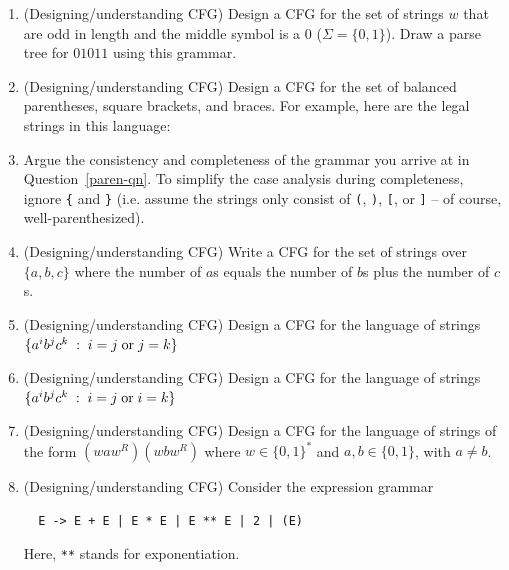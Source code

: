 \documentclass[12pt]{article}
\begin{document}
\begin{large}
\begin{enumerate}
\item (Designing/understanding CFG) Design a CFG for the  set of
  strings $w$ that are odd in length and the middle symbol is a $0$ ($\Sigma=\{0,1\}$).
  Draw a parse tree for $01011$ using this grammar.

\item \label{paren-qn} (Designing/understanding CFG) Design a CFG for the  set of
  balanced parentheses, square brackets, and braces. For example,
  here are the legal strings in this language:
  \begin{compactenum}
  \item   \verb| ()[]{} |
  \item   \verb|  {{[()()][{}]}} |
  \item   \verb| [ {{[()()][{}]}} ] |
  \item   \verb| [ {{[()()][{}]}} {[()()][{}]} ] ()[]{} |    
  \end{compactenum}

\item Argue the consistency and completeness of the grammar you arrive at in Question~\ref{paren-qn}.
  To simplify the case analysis during completeness,
  ignore \verb|{| and \verb|}| (i.e. assume the strings only consist of
  \verb|(|, \verb|)|, \verb|[|, or \verb|]| -- of course, well-parenthesized).

\item (Designing/understanding CFG)
  Write a CFG for the set of strings over $\{a,b,c\}$ where the number of $a$s
  equals the number of $b$s plus the number of $c$s.


\item \label{iEQjORjEQk}
  (Designing/understanding CFG) Design a CFG for the language of strings
  \( \{a^i b^j c^k \;:\; i=j\; {\rm or}\; j=k \} \)

\item \label{iEQjORiEQk}
  (Designing/understanding CFG) Design a CFG for the language of strings
  \( \{a^i b^j c^k \;:\; i=j\; {\rm or}\; i=k \} \)
  
\item (Designing/understanding CFG) Design a CFG for the language of strings
  of the form $(w a w^R)(w b w^R)$ where $w\in\{0,1\}^*$ and $a,b\in\{0,1\}$, with
  $a\neq b$.


\item (Designing/understanding CFG)
  Consider the expression grammar
\begin{verbatim}
  E -> E + E | E * E | E ** E | 2 | (E)
\end{verbatim}
Here, \verb|**| stands for exponentiation. 
\end{enumerate}
\end{large}
\end{document}
